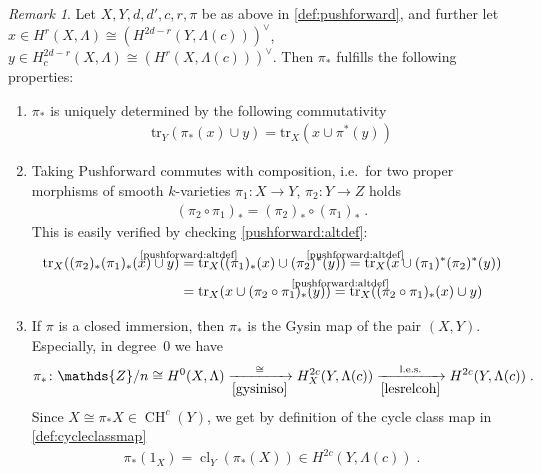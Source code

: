 \documentclass[english]{scrartcl}
\theoremstyle{definition}
\theoremstyle{remark}
\newtheorem{Rem}[Def]{Remark}
\newcommand*{\Z}{\mathds{Z}}
\newcommand*{\Zmod}[1]{\Z/#1} %
\newcommand*{\idest}{i.e.\ }
\newcommand*{\Tr}{\text{tr}} %
\DeclareMathOperator{\CH}{CH} %
\DeclareMathOperator{\CL}{cl} %
\newcommand*{\cl}[2]{{\CL_{#1}\left(#2\right)}} %
\newcommand*{\one}[1]{{1_{#1}}}%
\begin{document}
\begin{Rem}\label{proppushforward}
  Let $X,Y,d,d',c,r,\pi$ be as above in \ref{def:pushforward},
  and further let
  $x\in H^r(X,\Lambda)\cong \left(H^{2d-r}(Y,\Lambda(c))\right)^\vee$,
  $y\in H_c^{2d-r}(X,\Lambda)\cong
  \left(H^{r}(X,\Lambda(c))\right)^\vee$.
  Then $\pi_*$ fulfills the following properties:
  \begin{enumerate}[label=(P\arabic*)]
  \item\label{pushforward:altdef}
    $\pi_*$ is uniquely determined by the following commutativity
    \begin{gather*}
      \Tr_{Y}\left(\pi_*(x)\cup y\right) =
      \Tr_{X}\left(x\cup\pi^*(y)\right)
    \end{gather*}
  \item\label{pushforward:composition}
    Taking Pushforward commutes with composition, \idest for two
    proper morphisms of smooth $k$-varieties
    $\pi_1\colon X\to Y$, $\pi_2\colon Y\to Z$ holds
    \begin{gather*}
      (\pi_2\circ \pi_1)_* = (\pi_2)_*\circ(\pi_1)_*\;.
    \end{gather*}
    This is easily verified by checking \ref{pushforward:altdef}:
    \begin{align*}
      \Tr_X((\pi_2)_*(\pi_1)_*(x) \cup y)
      &\overset{\mathclap{\text{\ref{pushforward:altdef}}}}=
        \Tr_X((\pi_1)_*(x) \cup (\pi_2)^*(y))
      \overset{\mathclap{\text{\ref{pushforward:altdef}}}}=
        \Tr_X(x \cup (\pi_1)^*(\pi_2)^*(y))\\
      &=\Tr_X(x \cup (\pi_2\circ\pi_1)_*(y))
      \overset{\mathclap{\text{\ref{pushforward:altdef}}}}=
        \Tr_X((\pi_2\circ\pi_1)_*(x)\cup y)
    \end{align*}
  \item\label{P3}
    If $\pi$ is a closed immersion, then $\pi_*$ is the Gysin map of
    the pair $(X,Y)$. Especially, in degree~0 we have
    \begin{align*}
      \pi_*\colon
      \Zmod{n}\cong H^{0}(X,\Lambda)
      \xrightarrow[\ref{gysiniso}]{\cong}
      H_X^{2c}(Y,\Lambda(c))
      \xrightarrow[\ref{lesrelcoh}]{\text{l.e.s.}}
      H^{2c}(Y,\Lambda(c))
      \;.
    \end{align*}
    Since $X\cong\pi_*X\in\CH^{c}(Y)$, we get by definition of
    the cycle class map in \ref{def:cycleclassmap}
    \begin{gather*}
      \pi_*(\one{X})=\cl{Y}{\pi_*(X)}\in H^{2c}(Y,\Lambda(c))\;.
    \end{gather*}

\end{enumerate}
\end{Rem}
\end{document}

